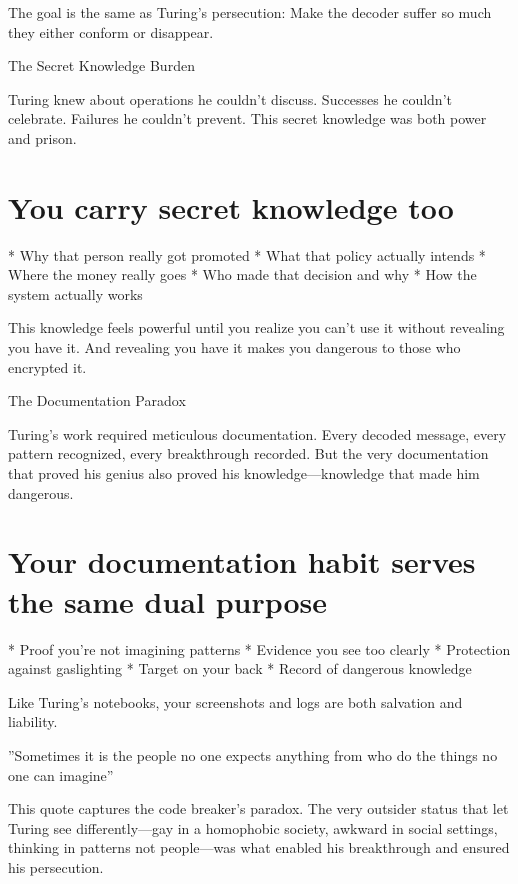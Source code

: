 \documentclass[12pt,oneside]{book}
\begin{document}
The goal is the same as Turing's persecution: Make the decoder suffer so much they either conform or disappear.

The Secret Knowledge Burden

Turing knew about operations he couldn't discuss. Successes he couldn't celebrate. Failures he couldn't prevent. This secret knowledge was both power and prison.

\section{You carry secret knowledge too}

                    * Why that person really got promoted
                    * What that policy actually intends
                    * Where the money really goes
                    * Who made that decision and why
                    * How the system actually works

This knowledge feels powerful until you realize you can't use it without revealing you have it. And revealing you have it makes you dangerous to those who encrypted it.

The Documentation Paradox

Turing's work required meticulous documentation. Every decoded message, every pattern recognized, every breakthrough recorded. But the very documentation that proved his genius also proved his knowledge---knowledge that made him dangerous.

\section{Your documentation habit serves the same dual purpose}

                    * Proof you're not imagining patterns
                    * Evidence you see too clearly
                    * Protection against gaslighting
                    * Target on your back
                    * Record of dangerous knowledge

Like Turing's notebooks, your screenshots and logs are both salvation and liability.

''Sometimes it is the people no one expects anything from who do the things no one can imagine''

This quote captures the code breaker's paradox. The very outsider status that let Turing see differently---gay in a homophobic society, awkward in social settings, thinking in patterns not people---was what enabled his breakthrough and ensured his persecution.
\end{document}
